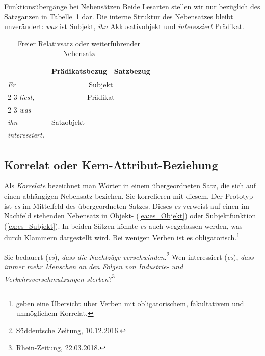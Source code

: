 \begin{Exkurs}{Funktionsübergänge bei Nebensätzen}
Beide Lesarten stellen wir nur bezüglich des Satzganzen in Tabelle~\ref{tab:weiterführenderNeSa_frRel} dar. Die interne Struktur des Nebensatzes bleibt unverändert: \textit{was} ist Subjekt, \textit{ihn} Akkusativobjekt und \textit{interessiert} Prädikat.

\begin{table}
  \centering
  \begin{tabular}{l|l|l}
      & Prädikatsbezug  & Satzbezug\\
    \hline
    \textit{Er} & \multicolumn{2}{c}{Subjekt}\\ \cline{2-3}
    \textit{liest,} & \multicolumn{2}{c}{Prädikat} \\ \cline{2-3}
    \textit{was} & \multirow{3}{*}{Satzobjekt} & \\ 
    \textit{ihn} & & \\ 
    \textit{interessiert.} &  & \\ 
    \hline 
  \end{tabular}
  \caption{Freier Relativsatz oder weiterführender Nebensatz}
  \label{tab:weiterführenderNeSa_frRel}
\end{table}

\end{Exkurs}



\subsection{Korrelat oder Kern-Attribut-Beziehung}\label{subsection:Korrelat}

Als \textit{Korrelate} bezeichnet man Wörter in einem übergeordneten Satz, die sich auf einen abhängigen Nebensatz beziehen. Sie korrelieren mit diesem. Der Prototyp ist \textit{es} im Mittelfeld des übergeordneten Satzes. Dieses \textit{es} verweist auf einen im Nachfeld stehenden Nebensatz in Objekt- (\ref{ea:es_Objekt}) oder Subjektfunktion (\ref{ex:es_Subjekt}). In beiden Sätzen könnte \textit{es} auch weggelassen werden, was durch Klammern dargestellt wird. Bei wenigen Verben ist es obligatorisch.\footnote{\citet[99]{HelbigBuscha} geben eine Übersicht über Verben mit obligatorischem, fakultativem und unmöglichem Korrelat.}

\ea \label{ea:es_Korrelat}
\ea \label{ea:es_Objekt} Sie bedauert (\textit{es}), \textit{dass die Nachtzüge verschwinden}.\footnote{Süddeutsche Zeitung, 10.12.2016.}
\ex \label{ex:es_Subjekt} Wen interessiert (\textit{es}), \textit{dass immer mehr Menschen an den Folgen von Industrie- und Verkehrsverschmutzungen sterben}?\footnote{Rhein-Zeitung, 22.03.2018.} 
\z 
\z 


